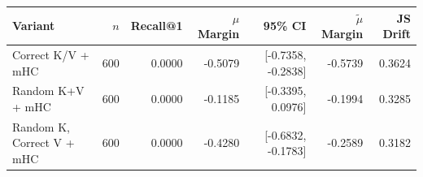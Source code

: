 \begin{tabular}{l r r r r r r}
\toprule
Variant & $n$ & Recall@1 & $\mu$ Margin & 95\% CI & $\tilde{\mu}$ Margin & JS Drift \\
\midrule
Correct K/V + mHC & 600 & 0.0000 & -0.5079 & [-0.7358, -0.2838] & -0.5739 & 0.3624 \\
Random K+V + mHC & 600 & 0.0000 & -0.1185 & [-0.3395, 0.0976] & -0.1994 & 0.3285 \\
Random K, Correct V + mHC & 600 & 0.0000 & -0.4280 & [-0.6832, -0.1783] & -0.2589 & 0.3182 \\
\bottomrule
\end{tabular}
